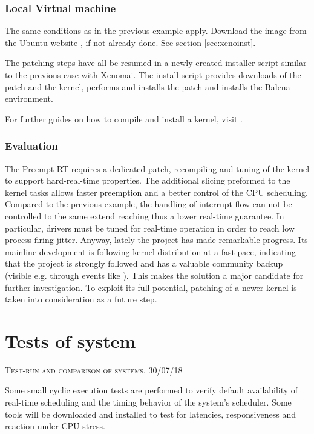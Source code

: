 \documentclass[]{scrartcl}
\begin{document}
\subsubsection{Local Virtual machine}

The same conditions as in the previous example apply. Download the image from the Ubuntu website \cite{ubuntu02}, if not already done. See section \ref{sec:xenoinst}.

The patching steps have all be resumed in a newly created installer script similar to the previous case with Xenomai. The install script provides downloads of the patch and the kernel, performs and installs the patch and installs the Balena environment.

For further guides on how to compile and install a kernel, visit \cite{misc01}.

\subsubsection{Evaluation}

The Preempt-RT requires a dedicated patch, recompiling and tuning of the kernel to support hard-real-time properties. The additional slicing preformed to the kernel tasks allows faster preemption and a better control of the CPU scheduling.
Compared to the previous example, the handling of interrupt flow can not be controlled to the same extend reaching thus a lower real-time guarantee.
In particular, drivers must be tuned for real-time operation in order to reach low process firing jitter.
Anyway, lately the project has made remarkable progress.
Its mainline development is following kernel distribution at a fast pace, indicating that the project is strongly followed and has a valuable community backup (visible e.g. through events like \cite{lfnd02}).
This makes the solution a major candidate for further investigation.
To exploit its full potential, patching of a newer kernel is taken into consideration as a future step.

\section{Tests of system}

{\small\textsc{Test-run and comparison of systems, 30/07/18} \bigskip}

Some small cyclic execution tests are performed to verify default availability of real-time scheduling and the timing behavior of the system's scheduler. Some tools will be downloaded and installed to test for latencies, responsiveness and reaction under CPU stress. 
\end{document}
